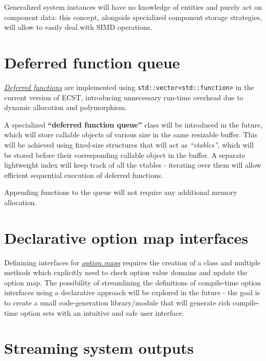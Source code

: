 \documentclass[twoside, 12pt, a4paper, openany]{book}
\begin{document}
Generalized system instances will have no knowledge of entities and
purely act on component data: this concept, alongside specialized
component storage strategies, will allow to easily deal with SIMD
operations.

\section{Deferred function queue}\label{deferred-function-queue}

\protect\hyperlink{flow_exec_dfuncs}{\emph{Deferred functions}} are
implemented using
\texttt{std::vector<std::function>}
in the current version of ECST, introducing unnecessary run-time
overhead due to dynamic allocation and polymorphism.

A specialized \textbf{``deferred function queue''} class will be
introduced in the future, which will store callable objects of various
size in the same resizable buffer. This will be achieved using
fixed-size structures that will act as \emph{``vtables''}, which will be
stored before their corresponding callable object in the buffer. A
separate lightweight index will keep track of all the vtables -
iterating over them will allow efficient sequential execution of
deferred functions.

Appending functions to the queue will not require any additional memory
allocation.

\section{Declarative option map
interfaces}\label{declarative-option-map-interfaces}

Definining interfaces for
\protect\hyperlink{metaprogramming_option_maps}{\emph{option maps}}
requires the creation of a class and multiple methods which explicitly
need to check option value domains and update the option map. The
possibility of streamlining the definitions of compile-time option
interfaces using a declarative approach will be explored in the future -
the goal is to create a small code-generation library/module that will
generate rich compile-time option sets with an intuitive and safe user
interface.

\section{Streaming system outputs}\label{streaming-system-outputs}
\end{document}
